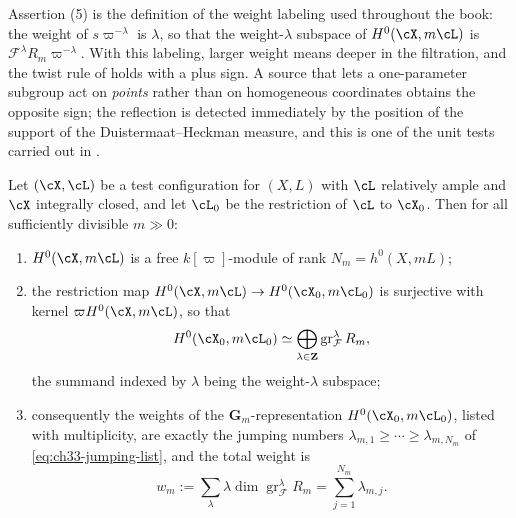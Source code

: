 \begin{remark}
\label{rem:ch33-weight-sign}
Assertion (5) is the definition of the weight labeling used throughout the
book: the weight of $s\varpi^{-\lambda}$ is $\lambda$, so that the
weight-$\lambda$ subspace of $H^0(\cX,m\cL)$ is
$\mathcal F^\lambda R_m\varpi^{-\lambda}$.  With this labeling, larger
weight means deeper in the filtration, and the twist rule of
 holds with a plus sign.  A source that lets
a one-parameter subgroup act on \emph{points} rather than on homogeneous
coordinates obtains the opposite sign; the reflection is detected
immediately by the position of the support of the Duistermaat--Heckman
measure, and this is one of the unit tests carried out in
.
\end{remark}

\begin{proposition}
\label{prop:ch33-central-fibre-weights}
Let $(\cX,\cL)$ be a test configuration for $(X,L)$ with $\cL$
relatively ample and $\cX$ integrally closed, and let $\cL_0$ be the
restriction of $\cL$ to $\cX_0$.  Then for all sufficiently divisible
$m\gg0$:
\begin{enumerate}
\item $H^0(\cX,m\cL)$ is a free $k[\varpi]$-module of rank
 $N_m=h^0(X,mL)$;
\item the restriction map
 $H^0(\cX,m\cL)\to H^0(\cX_0,m\cL_0)$ is surjective with kernel
 $\varpi H^0(\cX,m\cL)$, so that
\begin{equation}
\label{eq:ch33-central-fibre-graded}
 H^0(\cX_0,m\cL_0)
 \simeq
 \bigoplus_{\lambda\in\mathbf Z}\operatorname{gr}^\lambda_{\mathcal F}R_m ,
\end{equation}
 the summand indexed by $\lambda$ being the weight-$\lambda$ subspace;
\item consequently the weights of the $\mathbf G_m$-representation
 $H^0(\cX_0,m\cL_0)$, listed with multiplicity, are exactly the jumping
 numbers $\lambda_{m,1}\geq\cdots\geq\lambda_{m,N_m}$ of
 \eqref{eq:ch33-jumping-list}, and the total weight is
\begin{equation}
\label{eq:ch33-total-weight}
 w_m:=\sum_{\lambda}\lambda\dim\operatorname{gr}^\lambda_{\mathcal F}R_m
     =\sum_{j=1}^{N_m}\lambda_{m,j}.
\end{equation}
\end{enumerate}
\end{proposition}

